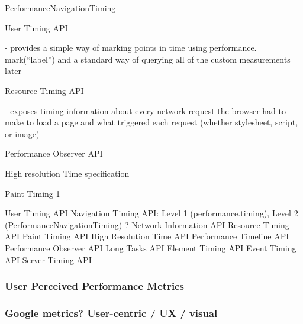 PerformanceNavigationTiming %


User Timing API %

- provides a simple way of marking points in time using performance. mark(“label”) and a standard way of querying all of the custom measurements later


Resource Timing API %

- exposes timing information about every network request the browser had to make to load a page and what triggered each request (whether stylesheet, script, or image)




Performance Observer API %



High resolution Time specification




Paint Timing 1



User Timing API
Navigation Timing API: Level 1 (performance.timing), Level 2 (PerformanceNavigationTiming) ?
Network Information API
Resource Timing API
Paint Timing API
High Resolution Time API
Performance Timeline API
Performance Observer API
Long Tasks API
Element Timing API
Event Timing API
Server Timing API












\subsubsection{User Perceived Performance Metrics}









\subsubsection{Google metrics? User-centric / UX / visual}



